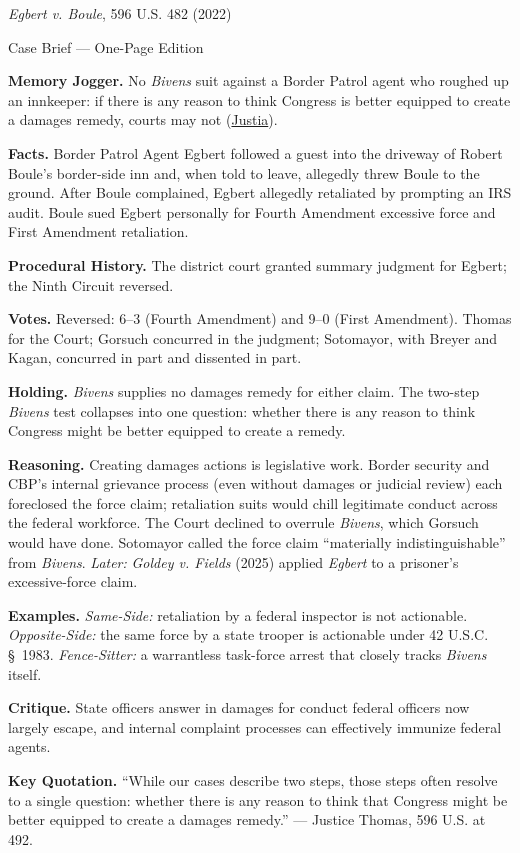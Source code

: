 \documentclass[12pt]{article}
\begin{document}
\begin{center}
{\Large \textit{Egbert v. Boule}, 596 U.S. 482 (2022)\par}
\vspace{0.3em}
{\normalsize Case Brief --- One-Page Edition\par}
\end{center}

\textbf{Memory Jogger.} No \textit{Bivens} suit against a Border Patrol agent who roughed up an innkeeper: if there is any reason to think Congress is better equipped to create a damages remedy, courts may not (\href{https://supreme.justia.com/cases/federal/us/596/21-147/}{Justia}).

\textbf{Facts.} Border Patrol Agent Egbert followed a guest into the driveway of Robert Boule's border-side inn and, when told to leave, allegedly threw Boule to the ground. After Boule complained, Egbert allegedly retaliated by prompting an IRS audit. Boule sued Egbert personally for Fourth Amendment excessive force and First Amendment retaliation.

\textbf{Procedural History.} The district court granted summary judgment for Egbert; the Ninth Circuit reversed.

\textbf{Votes.} Reversed: 6--3 (Fourth Amendment) and 9--0 (First Amendment). Thomas for the Court; Gorsuch concurred in the judgment; Sotomayor, with Breyer and Kagan, concurred in part and dissented in part.

\textbf{Holding.} \textit{Bivens} supplies no damages remedy for either claim. The two-step \textit{Bivens} test collapses into one question: whether there is any reason to think Congress might be better equipped to create a remedy.

\textbf{Reasoning.} Creating damages actions is legislative work. Border security and CBP's internal grievance process (even without damages or judicial review) each foreclosed the force claim; retaliation suits would chill legitimate conduct across the federal workforce. The Court declined to overrule \textit{Bivens}, which Gorsuch would have done. Sotomayor called the force claim ``materially indistinguishable'' from \textit{Bivens}. \emph{Later:} \textit{Goldey v. Fields} (2025) applied \textit{Egbert} to a prisoner's excessive-force claim.

\textbf{Examples.} \emph{Same-Side:} retaliation by a federal inspector is not actionable. \emph{Opposite-Side:} the same force by a state trooper is actionable under 42 U.S.C. \S~1983. \emph{Fence-Sitter:} a warrantless task-force arrest that closely tracks \textit{Bivens} itself.

\textbf{Critique.} State officers answer in damages for conduct federal officers now largely escape, and internal complaint processes can effectively immunize federal agents.

\textbf{Key Quotation.} ``While our cases describe two steps, those steps often resolve to a single question: whether there is any reason to think that Congress might be better equipped to create a damages remedy.'' --- Justice Thomas, 596 U.S. at 492.
\end{document}
